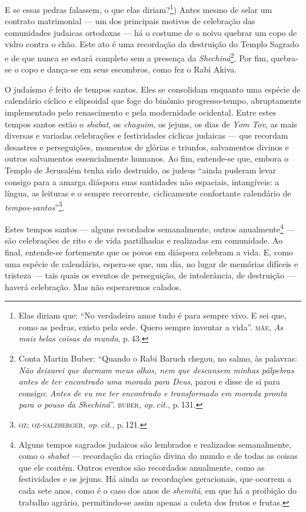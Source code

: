 E se essas pedras falassem, o que elas diriam?\footnote{Elas diriam que:
``No verdadeiro amor tudo é para sempre vivo. E sei que, como as
  pedras, existo pela sede. Quero sempre inventar a vida''. \textsc{mãe}, \emph{As mais belas coisas do mundo}, p.\,43.}) Antes mesmo
de selar um contrato matrimonial --- um dos principais motivos de
celebração das comunidades judaicas ortodoxas --- há o costume de o
noivo quebrar um copo de vidro contra o chão. Este ato é uma recordação
da destruição do Templo Sagrado e de que nunca se estará completo sem a
presença da \emph{Shechiná}\footnote{Conta Martin Buber: ``Quando
  o Rabi Baruch chegou, no salmo, às palavras: \emph{Não deixarei que durmam
  meus olhos, nem que descansem minhas pálpebras antes de ter encontrado
  uma morada para Deus}, parou e disse de si para consigo: \emph{Antes de eu
  me ter encontrado e transformado em morada pronta para o pouso da
  Shechiná}''. \textsc{buber}, \emph{op.\,cit.}, p.\,131.}. Por fim, quebra-se o copo e dança-se
em seus escombros, como fez o Rabi Akiva.

O judaísmo é feito de tempos santos. Eles se consolidam enquanto uma
espécie de calendário cíclico e elipsoidal que foge do binômio
progresso-tempo, abruptamente implementado pelo renascimento e pela
modernidade ocidental. Entre estes tempos santos estão o \emph{shabat},
os \emph{chaguim}, os jejuns, os dias de \emph{Yom Tov}, as mais
diversas e variadas celebrações e festividades cíclicas judaicas --- que
recordam desastres e perseguições, momentos de glórias e triunfos,
salvamentos divinos e outros salvamentos essencialmente humanos. Ao fim,
entende-se que, embora o Templo de Jerusalém tenha sido destruído, os
judeus ``ainda puderam levar consigo para a amarga diáspora suas
santidades não espaciais, intangíveis: a língua, as leituras e o sempre
recorrente, ciclicamente confortante calendário de
\emph{tempos-santos}''\footnote{\textsc{oz; oz-salzberger}, \emph{op.\,cit.}, p.\,121.}.

Estes tempos santos --- alguns recordados semanalmente, outros
anualmente\footnote{Alguns tempos sagrados judaicos são lembrados e
  realizados semanalmente, como o \emph{shabat} --- recordação da
  criação divina do mundo e de todas as coisas que ele contém. Outros
  eventos são recordados anualmente, como as festividades e os jejuns.
  Há ainda as recordações geracionais, que ocorrem a cada sete anos,
  como é o caso dos anos de \emph{shemitá}, em que há a proibição do
  trabalho agrário, permitindo-se assim apenas a coleta dos frutos e
  frutas.} --- são celebrações de rito e de vida partilhadas e
realizadas em comunidade. Ao final, entende-se fortemente que os povos
em diáspora celebram a vida. E, como uma espécie de calendário,
espera-se que, um dia, no lugar de memórias difíceis e tristeza --- tais
quais os eventos de perseguição, de intolerância, de destruição ---
haverá celebração. Mas não esperaremos calados.

